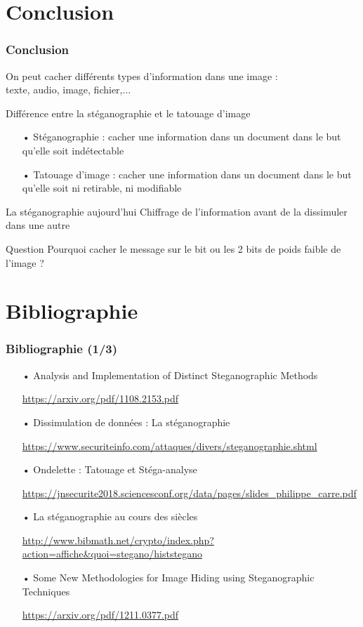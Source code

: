 \documentclass{beamer}
\begin{document}
\section{Conclusion}
\begin{frame}
\frametitle{Conclusion}

\begin{block}{}
On peut cacher différents types d'information dans une image : \\
texte, audio, image, fichier,...
\end{block}

\begin{block}{Différence entre la stéganographie et le tatouage d'image}
\begin{itemize}
    \item[•] Stéganographie : cacher une information dans un document dans le but qu'elle soit indétectable
    \item[•] Tatouage d'image : cacher une information dans un document dans le but qu'elle soit ni retirable, ni modifiable
\end{itemize}
\end{block}

\begin{exampleblock}{La stéganographie aujourd'hui}
Chiffrage de l'information avant de la dissimuler dans une autre
\end{exampleblock}

\begin{alertblock}{Question}
Pourquoi cacher le message sur le bit ou les 2 bits de poids faible de l'image ?
\end{alertblock}

\end{frame}

\section{Bibliographie}
\begin{frame}
\frametitle{Bibliographie (1/3)}
	
\begin{itemize}
\item[•] Analysis and Implementation of Distinct Steganographic Methods
\item[] \url{https://arxiv.org/pdf/1108.2153.pdf}
\item[•] Dissimulation de données : La stéganographie
\item[] \url{https://www.securiteinfo.com/attaques/divers/steganographie.shtml}
\item[•] Ondelette : Tatouage et Stéga-analyse
\item[] \url{https://jnsecurite2018.sciencesconf.org/data/pages/slides_philippe_carre.pdf}
\item[•] La stéganographie au cours des siècles
\item[] \url{http://www.bibmath.net/crypto/index.php?action=affiche&quoi=stegano/histstegano}
\item[•] Some New Methodologies for Image Hiding using Steganographic Techniques
\item[] \url{https://arxiv.org/pdf/1211.0377.pdf}
\end{itemize}
\end{frame}
\end{document}
